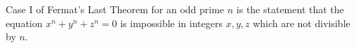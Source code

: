 Case I of Fermat's Last Theorem for an odd prime $n$ is the statement that the equation $x^n + y^n + z^n = 0$ is impossible in integers $x, y, z$ which are not divisible by $n$.
